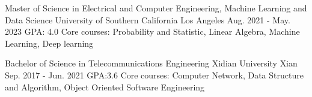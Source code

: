 \begin{cventries}
	
	
	
	\cventry
	{Master of Science in Electrical and Computer Engineering, Machine Learning and Data Science} %
	{University of Southern California} %
	{Los Angeles} %
	{Aug. 2021 - May. 2023} %
	{GPA: 4.0
 Core courses: Probability and Statistic, Linear Algebra, Machine Learning, Deep learning} %
	\vspace{0mm} 
	
	\cventry
	{Bachelor of Science in Telecommunications Engineering} %
	{Xidian University} %
	{Xian} %
	{Sep. 2017 - Jun. 2021} %
	{GPA:3.6
 Core courses: Computer Network, Data Structure and Algorithm, Object Oriented Software Engineering}%
	\vspace{0mm} 
\end{cventries}

